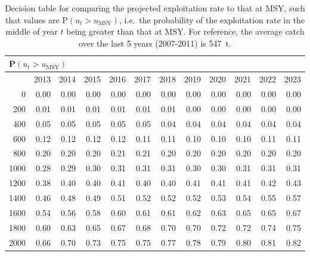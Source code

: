 \begin{table}[ht]
\begin{center}
\caption{Decision table for comparing the projected exploitation rate to that at MSY, such that values are P$(u_t > u_\mathrm{MSY})$, i.e.~the probability of the exploitation rate in the middle of year $t$ being greater than that at MSY. For reference, the average catch over the last 5 years (2007-2011) is 547~t.}
\label{tab:umsy.10yr}
\begin{tabular}{rrrrrrrrrrrr}
\multicolumn{12}{l}{P$(u_t > u_\mathrm{MSY})$} \\
  \hline
 & 2013 & 2014 & 2015 & 2016 & 2017 & 2018 & 2019 & 2020 & 2021 & 2022 & 2023 \\ 
  \hline
0 & 0.00 & 0.00 & 0.00 & 0.00 & 0.00 & 0.00 & 0.00 & 0.00 & 0.00 & 0.00 & 0.00 \\ 
  200 & 0.01 & 0.01 & 0.01 & 0.01 & 0.01 & 0.01 & 0.00 & 0.00 & 0.00 & 0.00 & 0.00 \\ 
  400 & 0.05 & 0.05 & 0.05 & 0.05 & 0.05 & 0.04 & 0.04 & 0.04 & 0.04 & 0.04 & 0.04 \\ 
  600 & 0.12 & 0.12 & 0.12 & 0.12 & 0.11 & 0.11 & 0.10 & 0.10 & 0.10 & 0.11 & 0.11 \\ 
  800 & 0.20 & 0.20 & 0.20 & 0.21 & 0.21 & 0.20 & 0.20 & 0.20 & 0.20 & 0.20 & 0.20 \\ 
  1000 & 0.28 & 0.29 & 0.30 & 0.31 & 0.31 & 0.31 & 0.30 & 0.30 & 0.31 & 0.31 & 0.31 \\ 
  1200 & 0.38 & 0.40 & 0.40 & 0.41 & 0.40 & 0.40 & 0.41 & 0.41 & 0.41 & 0.42 & 0.43 \\ 
  1400 & 0.46 & 0.48 & 0.49 & 0.51 & 0.52 & 0.52 & 0.52 & 0.53 & 0.54 & 0.55 & 0.57 \\ 
  1600 & 0.54 & 0.56 & 0.58 & 0.60 & 0.61 & 0.61 & 0.62 & 0.63 & 0.65 & 0.65 & 0.67 \\ 
  1800 & 0.60 & 0.63 & 0.65 & 0.67 & 0.68 & 0.70 & 0.70 & 0.72 & 0.72 & 0.74 & 0.75 \\ 
  2000 & 0.66 & 0.70 & 0.73 & 0.75 & 0.75 & 0.77 & 0.78 & 0.79 & 0.80 & 0.81 & 0.82 \\ 
   \hline
\end{tabular}
\end{center}
\end{table}




\clearpage


